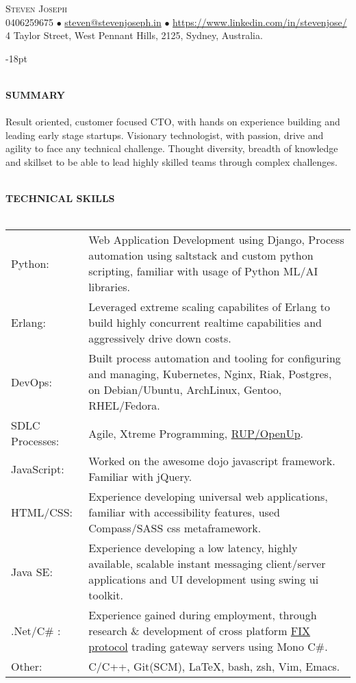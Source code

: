 \documentclass[10pt]{article}
\newcommand{\lineunder}{\vspace*{-10pt} \\ \hspace*{-18pt} \hrulefill \vspace{2pt}\\}
\newcommand{\header}[1]{{\hspace*{-15pt}\vspace*{-0pt}\\ \uppercase{\textbf {#1}}}  \lineunder}
\newcommand{\contact}[4]{
\vspace*{-19pt}
\begin{flushleft}
{\hspace*{-15pt} \Huge \scshape \scshape {#1}}\\
#2\\
#3
\newline
\end{flushleft}
}
\begin{document}
\contact{Steven Joseph}
{0406259675  $\bullet$ \href{mailto:steven@stevenjoseph.in}{steven@stevenjoseph.in} $\bullet$  \href{https://www.linkedin.com/in/stevenjose/}{https://www.linkedin.com/in/stevenjose/}}
{4 Taylor Street, West Pennant Hills, 2125, Sydney, Australia.}

\vspace{-18pt}


\header{Summary}
Result oriented, customer focused CTO, with hands on experience building and leading early stage startups.
Visionary technologist, with passion, drive and agility to face any technical challenge.
Thought diversity, breadth of knowledge and skillset to be able to lead highly skilled teams through complex challenges.


\header{Technical Skills}
\vspace{2pt}
\begin{tabular*}{\textwidth}{p{3cm}p{}}
    Python: & Web Application Development using Django, Process automation using saltstack and custom python scripting, familiar with usage of Python ML/AI libraries. \\
    Erlang: & Leveraged extreme scaling capabilites of Erlang to build highly concurrent realtime capabilities and aggressively drive down costs. \\
    DevOps: & Built process automation and tooling for configuring and managing, Kubernetes, Nginx, Riak, Postgres, on Debian/Ubuntu, ArchLinux, Gentoo, RHEL/Fedora. \\
    SDLC Processes: & Agile, Xtreme Programming, \href{http://en.wikipedia.org/wiki/Unified\_process}{RUP/OpenUp}. \\
    JavaScript: & Worked on the awesome dojo javascript framework. Familiar with jQuery. \\
    HTML/CSS: & Experience developing universal web applications, familiar with accessibility features, used Compass/SASS css metaframework. \\
    Java SE: & Experience developing a low latency, highly available, scalable instant messaging client/server applications and UI development using swing ui toolkit. \\
    .Net/C\# : & Experience gained during employment, through research \& development of cross platform \href{http://en.wikipedia.org/wiki/FIX_protocol}{FIX protocol} trading gateway servers using Mono C\#. \\
    Other: & C/C++, Git(SCM), \LaTeX, bash, zsh, Vim, Emacs.\\
\end{tabular*}
\end{document}
